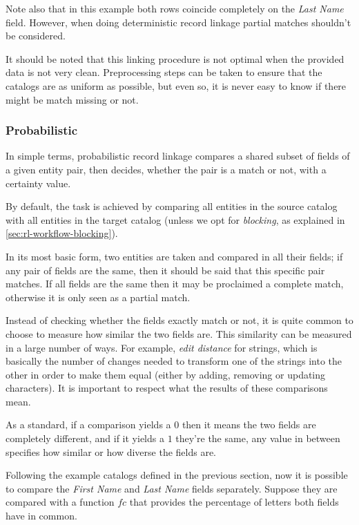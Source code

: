 \documentclass[epsfig,a4paper,11pt,titlepage,twoside,openany]{book}
\begin{document}
Note also that in this example both rows coincide completely on the \textit{Last Name} field. However, when doing deterministic record linkage partial matches shouldn't be considered.

It should be noted that this linking procedure is not optimal when the provided data is not very
clean. Preprocessing steps can be taken to ensure that the catalogs are as
uniform as possible, but even so, it is never easy to know if there might be match missing or not.


\subsubsection{Probabilistic}
\label{sec:rl-approach-probabilistic}

In simple terms, probabilistic record linkage \cite{Sayers2015} compares a shared subset of fields of a given entity pair,
then decides, whether the pair is a match or not, with a certainty value.

By default, the task is achieved by comparing all entities in the source
catalog with all entities in the target catalog (unless we opt for \textit{blocking}, as explained in \autoref{sec:rl-workflow-blocking}).

In its most basic form, two entities are taken and compared in all their fields; if any pair of fields are the same, then it should be said that this specific pair matches. If all
fields are the same then it may be proclaimed a complete match, otherwise it is only seen as a partial match.

Instead of checking whether the fields exactly match or not, it is quite common to choose to measure how similar the two fields are. This similarity can be measured
in a large number of ways. For example, \textit{edit distance} for strings, which is basically the number of changes needed to transform one of the strings into the other in order to make them equal (either by adding, removing or updating characters). It is
important to respect what the results of these comparisons mean. 

As a standard, if a comparison yields a $0$ then it means the two fields are completely
different, and if it yields a $1$ they're the same, any value in between
specifies how similar or how diverse the fields are.

Following the example catalogs defined in the previous section, now it is possible to compare the \textit{First Name} and \textit{Last Name} fields separately.
Suppose they are compared with a function $fc$ that provides the percentage of
letters both fields have in common.
\end{document}
